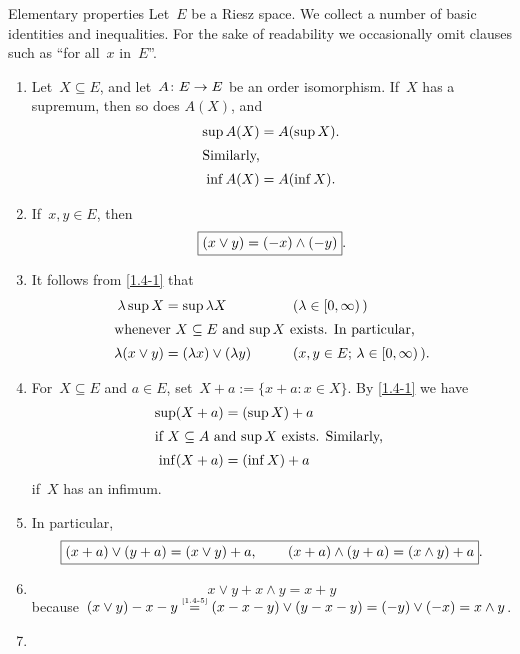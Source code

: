 \documentclass[main.tex]{subfiles}
\begin{document}
\begin{psec}{Elementary properties}
\label{1.4}
Let~$E$ be a Riesz space. 
We collect a number of basic identities and inequalities.
For the sake of readability
we occasionally omit clauses such as ``for all~$x$ in~$E$''.
\begin{enumerate}
\item %
\label{1.4-1}
Let~$X\subseteq E$, and let~$A\colon E\rightarrow E$ 
be an order isomorphism.
If~$X$ has a supremum,
then so does $A(X)$,
and
\begin{align*}
\sup A(X) &= A(\sup X)
\htam{.} \\
\intertext{%
Similarly, %
}
\inf A(X) &= A(\inf X)
\htam{.}
\end{align*}
\item %
\label{1.4-2}
If~$x,y\in E$, then
\begin{equation*}
\fbox{$  (x\vee y) = (-x)\wedge(-y)  $}
\textnormal{.}
\end{equation*}
\item %
\label{1.4-3}
It follows from \ref{1.4-1} that
\begin{alignat*}
\lambda \sup X &= \sup \lambda X \qquad &&(\lambda \in [0,\infty)\,) \\
\intertext{%
whenever~$X\subseteq E$ and~$\sup X$ exists.
In particular, }
\lambda (x \vee y) &=  (\lambda x) \vee (\lambda y) 
  \qquad &&(x,y\in E\htam{; }\lambda\in[0,\infty)\,)\htam{.}
\end{alignat*}
\item %
\label{1.4-4}
For~$X\subseteq E$ and $a\in E$,
set~$X+a:=\{x+a\colon x\in X\}$.
By \ref{1.4-1} we have
\begin{align*}
\sup(X+a) &= (\sup X) + a \\
\intertext{%
if $X\subseteq A$ and $\sup X$ exists.
Similarly, }
\inf (X+a) &= (\inf X)+a
\end{align*}
if~$X$ has an infimum.
\item %
\label{1.4-5}
In particular,
\begin{equation*}
\frmd{%
(x+a)\vee   (y+a)=(x\vee y)+a
\htam{, } \qquad 
(x+a)\wedge (y+a)=(x\wedge y)+a }
\htam{.}
\end{equation*}
\item %
\label{1.4-6}
\begin{equation*}
x\vee y + x\wedge y = x+y
\end{equation*}
because~$(x\vee y)-x-y 
\isref{1.4-5}
(x-x-y)\vee(y-x-y)=(-y)\vee(-x)=x\wedge y$.
\item %

\end{enumerate}
\end{psec}
\end{document}
